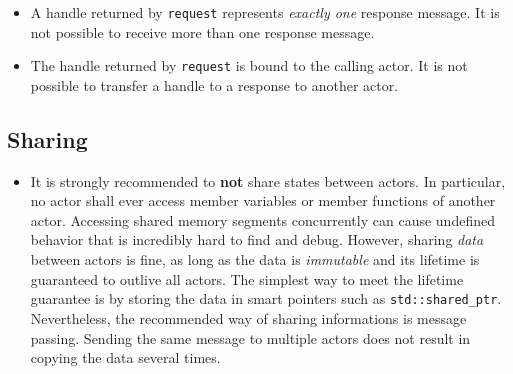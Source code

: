 \begin{itemize}
\item A handle returned by \lstinline^request^ represents \emph{exactly one}
  response message. It is not possible to receive more than one response
    message.
\item The handle returned by \lstinline^request^ is bound to the calling actor.
  It is not possible to transfer a handle to a response to another actor.
\end{itemize}

\clearpage

\subsection{Sharing}

\begin{itemize}
\item It is strongly recommended to \textbf{not} share states between actors.
  In particular, no actor shall ever access member variables or member
    functions of another actor. Accessing shared memory segments concurrently
    can cause undefined behavior that is incredibly hard to find and debug.
    However, sharing \textit{data} between actors is fine, as long as the data
    is \textit{immutable} and its lifetime is guaranteed to outlive all actors.
    The simplest way to meet the lifetime guarantee is by storing the data in
    smart pointers such as \lstinline^std::shared_ptr^. Nevertheless, the
    recommended way of sharing informations is message passing. Sending the
    same message to multiple actors does not result in copying the data several
    times.
\end{itemize}
